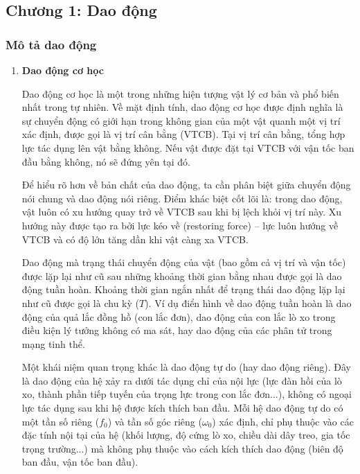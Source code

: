 \subsection{Chương 1: Dao động}

\subsubsection{Mô tả dao động}

\begin{enumerate}[label=\alph*)]
    \item \textbf{Dao động cơ học}
        
    Dao động cơ học là một trong những hiện tượng vật lý cơ bản và phổ biến nhất trong tự nhiên. Về mặt định tính, dao động cơ học được định nghĩa là sự chuyển động có giới hạn trong không gian của một vật quanh một vị trí xác định, được gọi là vị trí cân bằng (VTCB). Tại vị trí cân bằng, tổng hợp lực tác dụng lên vật bằng không. Nếu vật được đặt tại VTCB với vận tốc ban đầu bằng không, nó sẽ đứng yên tại đó.

    Để hiểu rõ hơn về bản chất của dao động, ta cần phân biệt giữa chuyển động nói chung và dao động nói riêng. Điểm khác biệt cốt lõi là: trong dao động, vật luôn có xu hướng quay trở về VTCB sau khi bị lệch khỏi vị trí này. Xu hướng này được tạo ra bởi lực kéo về (restoring force) – lực luôn hướng về VTCB và có độ lớn tăng dần khi vật càng xa VTCB.

    Dao động mà trạng thái chuyển động của vật (bao gồm cả vị trí và vận tốc) được lặp lại như cũ sau những khoảng thời gian bằng nhau được gọi là dao động tuần hoàn. Khoảng thời gian ngắn nhất để trạng thái dao động lặp lại như cũ được gọi là chu kỳ ($T$). Ví dụ điển hình về dao động tuần hoàn là dao động của quả lắc đồng hồ (con lắc đơn), dao động của con lắc lò xo trong điều kiện lý tưởng không có ma sát, hay dao động của các phân tử trong mạng tinh thể.

    Một khái niệm quan trọng khác là dao động tự do (hay dao động riêng). Đây là dao động của hệ xảy ra dưới tác dụng chỉ của nội lực (lực đàn hồi của lò xo, thành phần tiếp tuyến của trọng lực trong con lắc đơn...), không có ngoại lực tác dụng sau khi hệ được kích thích ban đầu. Mỗi hệ dao động tự do có một tần số riêng ($f_0$) và tần số góc riêng ($\omega_0$) xác định, chỉ phụ thuộc vào các đặc tính nội tại của hệ (khối lượng, độ cứng lò xo, chiều dài dây treo, gia tốc trọng trường...) mà không phụ thuộc vào cách kích thích dao động (biên độ ban đầu, vận tốc ban đầu).


\end{enumerate}
